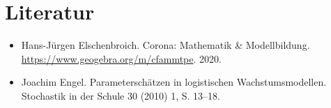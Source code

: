 \documentclass[a4paper,11pt]{article}
\begin{document}
\section{Literatur}

\begin{itemize}
\item Hans-Jürgen Elschenbroich. Corona: Mathematik \& Modellbildung.\\
  \url{https://www.geogebra.org/m/cfammtpe}.  2020.
\item Joachim Engel. Parameterschätzen in logistischen Wachstumsmodellen.
  Stochastik in der Schule 30 (2010) 1, S. 13–18.
\end{itemize}
\end{document}
